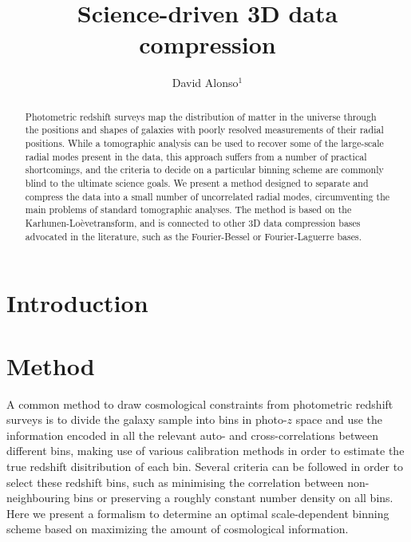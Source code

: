 \documentclass[twocolumn,amsfont,amssymb,amsmath, showpacs,balancelastpage, nofootinbib]{revtex4-1}
\newcommand{\kalo}{Karhunen-Lo\`{e}ve}
\begin{document}
\title{Science-driven 3D data compression}
\author{David Alonso$^1$}

\begin{abstract}
  Photometric redshift surveys map the distribution of matter in the universe through the positions and shapes of galaxies with poorly resolved measurements of their radial positions. While a tomographic analysis can be used to recover some of the large-scale radial modes present in the data, this approach suffers from a number of practical shortcomings, and the criteria to decide on a particular binning scheme are commonly blind to the ultimate science goals. We present a method designed to separate and compress the data into a small number of uncorrelated radial modes, circumventing the main problems of standard tomographic analyses. The method is based on the \kalo transform, and is connected to other 3D data compression bases advocated in the literature, such as the Fourier-Bessel or Fourier-Laguerre bases.
 \lipsum[0]
\end{abstract}

\maketitle

\section{Introduction}\label{sec:intro}
\lipsum[1]

\section{Method}\label{sec:method}
  A common method to draw cosmological constraints from photometric redshift surveys is to divide the galaxy sample into bins in photo-$z$ space and use the information encoded in all the relevant auto- and cross-correlations between different bins, making use of various calibration methods in order to estimate the true redshift disitribution of each bin. Several criteria can be followed in order to select these redshift bins, such as minimising the correlation between non-neighbouring bins or preserving a roughly constant number density on all bins. Here we present a formalism to determine an optimal scale-dependent binning scheme based on maximizing the amount of cosmological information.
\end{document}
